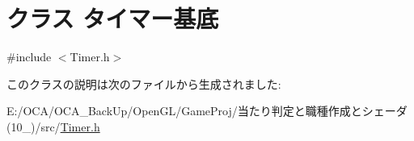 \hypertarget{class_xE3_x82_xBF_xE3_x82_xA4_xE3_x83_x9E_xE3_x83_xBC_xE5_x9F_xBA_xE5_xBA_x95}{\section{クラス タイマー基底}
\label{class_xE3_x82_xBF_xE3_x82_xA4_xE3_x83_x9E_xE3_x83_xBC_xE5_x9F_xBA_xE5_xBA_x95}
}


{\ttfamily \#include $<$Timer.\-h$>$}



このクラスの説明は次のファイルから生成されました\-:\begin{DoxyCompactItemize}
\item 
E\-:/\-O\-C\-A/\-O\-C\-A\-\_\-\-Back\-Up/\-Open\-G\-L/\-Game\-Proj/当たり判定と職種作成とシェーダ(10\-\_)/src/\hyperlink{_timer_8h}{Timer.\-h}\end{DoxyCompactItemize}
